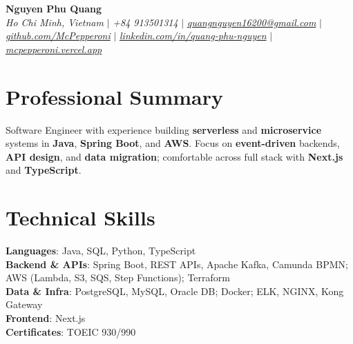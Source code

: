 \documentclass[letterpaper,10pt]{article}
\newcommand{\sectionspace}{
\vspace{-20pt}
}
\newcommand{\subheadingtitlevspace}{
\vspace{-3pt}
}
\newcommand{\titleItem}[2]{
 \textbf{#1}#2
}
\begin{document}

\begin{flushleft}
    \textbf{\large Nguyen Phu Quang} \\
    \textit{Ho Chi Minh, Vietnam} $|$
    \textit{+84 913501314} $|$
    \href{mailto:quangnguyen16200@gmail.com}{{\textit{quangnguyen16200@gmail.com}}} $|$
    \href{https://github.com/McPepperoni}{{\textit{github.com/McPepperoni}}} $|$
    \href{https://linkedin.com/in/quang-phu-nguyen}{{\textit{linkedin.com/in/quang-phu-nguyen}}} $|$
    \href{https://mcpepperoni.vercel.app/}{{\textit{mcpepperoni.vercel.app}}}
    \vspace{-8pt}
\end{flushleft}


\section{Professional Summary}
\vspace{-3pt}
\begin{itemize}[leftmargin=0.15in, label={}]
    {\item{
          {Software Engineer with experience building \textbf{serverless} and \textbf{microservice} systems in \textbf{Java}, \textbf{Spring Boot}, and \textbf{AWS}. Focus on \textbf{event-driven} backends, \textbf{API design}, and \textbf{data migration}; comfortable across full stack with \textbf{Next.js} and \textbf{TypeScript}.}
          }}
\end{itemize}
\sectionspace


\section{Technical Skills}
\subheadingtitlevspace
\begin{itemize}[leftmargin=0.15in, label={}]
    {\item{
          \titleItem{Languages}{: Java, SQL, Python, TypeScript} \\
          \titleItem{Backend \& APIs}{: Spring Boot, REST APIs, Apache Kafka, Camunda BPMN; AWS (Lambda, S3, SQS, Step Functions); Terraform} \\
          \titleItem{Data \& Infra}{: PostgreSQL, MySQL, Oracle DB; Docker; ELK, NGINX, Kong Gateway} \\
          \titleItem{Frontend}{: Next.js} \\
          \titleItem{Certificates}{: TOEIC 930/990}
          }}
\end{itemize}
\sectionspace
\end{document}
